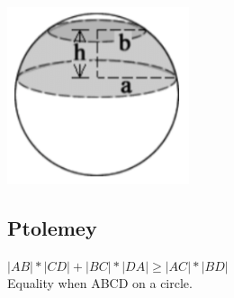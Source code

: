 \begin{center}\begin{minipage}{50mm}
\includegraphics[width=\textwidth]{content/various/ball-layer.png}
\end{minipage}\end{center}

\subsection{Ptolemey}
$|AB| * |CD| + |BC| * |DA| \ge |AC| * |BD|$\\
Equality when ABCD on a circle.
 
